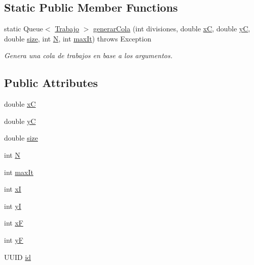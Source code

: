 \subsection*{Static Public Member Functions}
\begin{DoxyCompactItemize}
\item 
static Queue$<$ \hyperlink{classTrabajo}{Trabajo} $>$ \hyperlink{classTrabajo_a8591ebadea7e23ebe0790248d7991bec}{generar\+Cola} (int divisiones, double \hyperlink{classTrabajo_a8bef34fe0280b261439379d534321219}{xC}, double \hyperlink{classTrabajo_ab12a7045e2dbd243910e3d3b2f6961c9}{yC}, double \hyperlink{classTrabajo_af0d73a9cfef4f2d5268679cad9fa6fbc}{size}, int \hyperlink{classTrabajo_ac1b2b6bc4d1dd40b31f5faaf8c865577}{N}, int \hyperlink{classTrabajo_ac00b80469dd47378feefbedacfb199d9}{max\+It})  throws Exception 
\begin{DoxyCompactList}\small\item\em Genera una cola de trabajos en base a los argumentos. \end{DoxyCompactList}\end{DoxyCompactItemize}
\subsection*{Public Attributes}
\begin{DoxyCompactItemize}
\item 
double \hyperlink{classTrabajo_a8bef34fe0280b261439379d534321219}{xC}
\item 
double \hyperlink{classTrabajo_ab12a7045e2dbd243910e3d3b2f6961c9}{yC}
\item 
double \hyperlink{classTrabajo_af0d73a9cfef4f2d5268679cad9fa6fbc}{size}
\item 
int \hyperlink{classTrabajo_ac1b2b6bc4d1dd40b31f5faaf8c865577}{N}
\item 
int \hyperlink{classTrabajo_ac00b80469dd47378feefbedacfb199d9}{max\+It}
\item 
int \hyperlink{classTrabajo_a92e061e1e5acd2e5e771cb45a0ead2cf}{xI}
\item 
int \hyperlink{classTrabajo_ad2ebae404264d7c3e804dc126ecaaa96}{yI}
\item 
int \hyperlink{classTrabajo_abb0a6c97b22bc6151702b75c77ec3918}{xF}
\item 
int \hyperlink{classTrabajo_afef4f766ca0c979b9bd99a6b951314e9}{yF}
\item 
U\+U\+ID \hyperlink{classTrabajo_a6c0a2cc23650abac92831074e8bcf9e3}{id}
\end{DoxyCompactItemize}


